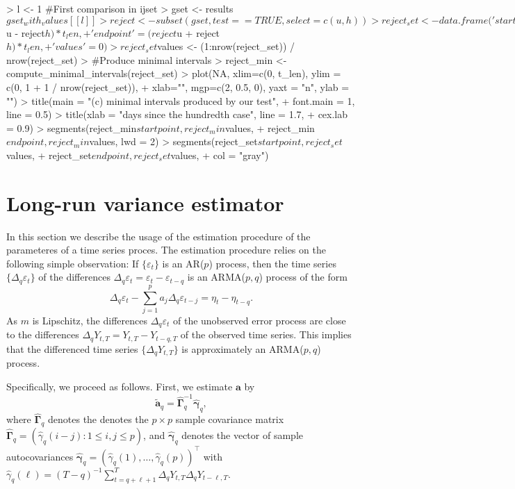 \documentclass[a4paper]{scrartcl}
\begin{document}
\begin{Schunk}
\begin{Sinput}
> l <- 1 #First comparison in ijset
> gset       <- results$gset_with_values[[l]]
> reject     <- subset(gset, test == TRUE, select = c(u, h))
> reject_set <- data.frame('startpoint' = (reject$u - reject$h) * t_len,
+                          'endpoint' = (reject$u + reject$h) * t_len,
+                          'values' = 0)
> reject_set$values <- (1:nrow(reject_set)) / nrow(reject_set)
> #Produce minimal intervals
> reject_min  <- compute_minimal_intervals(reject_set)
> plot(NA, xlim=c(0, t_len),  ylim = c(0, 1 + 1 / nrow(reject_set)),
+      xlab="", mgp=c(2, 0.5, 0), yaxt = "n", ylab = "")
> title(main = "(c) minimal intervals produced by our test",
+       font.main = 1, line = 0.5)
> title(xlab = "days since the hundredth case", line = 1.7,
+       cex.lab = 0.9)
> segments(reject_min$startpoint, reject_min$values,
+          reject_min$endpoint, reject_min$values, lwd = 2)
> segments(reject_set$startpoint, reject_set$values,
+          reject_set$endpoint, reject_set$values,
+          col = "gray")
\end{Sinput}
\end{Schunk}


\section{Long-run variance estimator}\label{sec:lrv}
In this section we describe the usage of the estimation procedure of the parameteres of a time series proces. The estimation procedure relies on the following simple observation: If $\{\varepsilon_t\}$ is an AR($p$) process, then the time series $\{ \Delta_q \varepsilon_t \}$ of the differences $\Delta_q \varepsilon_t = \varepsilon_t - \varepsilon_{t-q}$ is an ARMA($p,q$) process of the form
\begin{equation*}
\Delta_q \varepsilon_t - \sum_{j=1}^{p} a_j \Delta_q \varepsilon_{t-j} = \eta_t - \eta_{t-q}. 
\end{equation*}
As $m$ is Lipschitz, the differences $\Delta_q \varepsilon_t$ of the unobserved error process are close to the differences $\Delta_q Y_{t,T} = Y_{t, T} - Y_{t-q, T}$ of the observed time series. This implies that the differenced time series $\{ \Delta_q Y_{t,T} \}$ is approximately an ARMA($p,q$) process.

Specifically, we proceed as follows. First, we estimate $\boldsymbol{a}$ by 
\begin{equation*}
\widetilde{\boldsymbol{a}}_q = \widehat{\boldsymbol{\Gamma}}_q^{-1} \widehat{\boldsymbol{\gamma}}_q, 
\end{equation*}
where $\widehat{\boldsymbol{\Gamma}}_q$ denotes the denotes the $p \times p$ sample covariance matrix \linebreak $\widehat{\boldsymbol{\Gamma}}_q = (\widehat{\gamma}_q(i-j): 1 \le i,j \le p)$, and $\widehat{\boldsymbol{\gamma}}_q$ denotes the vector of sample autocovariances $\widehat{\boldsymbol{\gamma}}_q = (\widehat{\gamma}_q(1), \dots,\widehat{\gamma}_q(p))^\top$ with $\widehat{\gamma}_q(\ell) = (T-q)^{-1} \sum_{t=q+\ell+1}^T \Delta_q Y_{t,T} \Delta_q Y_{t-\ell,T}$.
\end{document}
